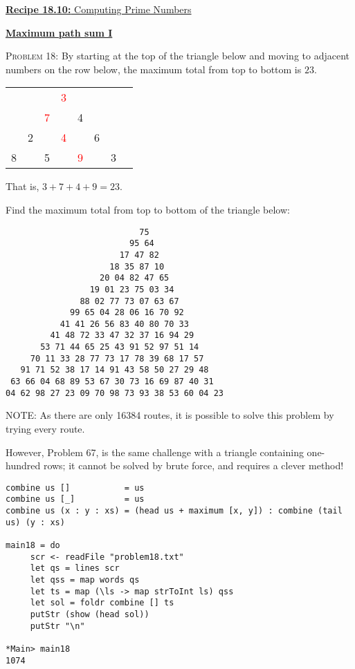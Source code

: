 \documentclass[11pt]{article}
\begin{document}
\href{http://www.onlamp.com/pub/a/python/excerpt/pythonckbk_chap1/index1.html?page=last}{\textbf{Recipe 18.10:} Computing Prime Numbers}
\par\bigskip\noindent
\href{https://projecteuler.net/problem=18}{\textbf{Maximum path sum I}}\par\noindent
\textsc{Problem 18:}
By starting at the top of the triangle below and moving to adjacent numbers on the row below, the maximum total from top to bottom is $23$.
\par\medskip
\begin{tabular}{cccccccc}
    &  & & \textcolor{red}{3} &   & & &\\
    &  &\textcolor{red}{7}&  &  4 & & &\\
    &2&   &\textcolor{red}{4}&   &6 & &\\
  8& & 5 &  &\textcolor{red}{9}&   & 3
\end{tabular}
\par\bigskip
That is, $3 + 7 + 4 + 9 = 23$.
\par
Find the maximum total from top to bottom of the triangle below:
\par{\tiny
\begin{verbatim}
                           75
                         95 64
                       17 47 82
                     18 35 87 10
                   20 04 82 47 65
                 19 01 23 75 03 34
               88 02 77 73 07 63 67
             99 65 04 28 06 16 70 92
           41 41 26 56 83 40 80 70 33
         41 48 72 33 47 32 37 16 94 29
       53 71 44 65 25 43 91 52 97 51 14
     70 11 33 28 77 73 17 78 39 68 17 57
   91 71 52 38 17 14 91 43 58 50 27 29 48
 63 66 04 68 89 53 67 30 73 16 69 87 40 31
04 62 98 27 23 09 70 98 73 93 38 53 60 04 23
\end{verbatim}
}
\par\bigskip
NOTE: As there are only 16384 routes, it is possible to solve this problem by trying every route.\par
However, Problem 67, is the same challenge with a triangle containing one-hundred rows; it cannot be solved by brute force, and requires a clever method! 
\par
\begin{lstlisting}
combine us []           = us
combine us [_]          = us
combine us (x : y : xs) = (head us + maximum [x, y]) : combine (tail us) (y : xs)

main18 = do
     scr <- readFile "problem18.txt" 
     let qs = lines scr
     let qss = map words qs
     let ts = map (\ls -> map strToInt ls) qss
     let sol = foldr combine [] ts
     putStr (show (head sol))
     putStr "\n"

*Main> main18
1074
\end{lstlisting}
\end{document}
